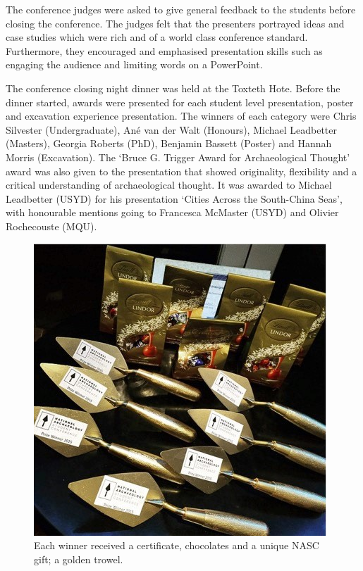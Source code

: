The conference judges were asked to give general feedback to the students before closing the conference. The judges felt that the presenters portrayed ideas and case studies which were rich and of a world class conference standard. Furthermore, they encouraged and emphasised presentation skills such as engaging the audience and limiting words on a PowerPoint. 

The conference closing night dinner was held at the Toxteth Hote. Before the dinner started, awards were presented for each student level presentation, poster and excavation experience presentation. The winners of each category were Chris Silvester (Undergraduate), Ané van der Walt (Honours), Michael Leadbetter (Masters), Georgia Roberts (PhD), Benjamin Bassett (Poster) and Hannah Morris (Excavation). The ‘Bruce G. Trigger Award for Archaeological Thought’ award was also given to the presentation that showed originality, flexibility and a critical understanding of archaeological thought. It was awarded to Michael Leadbetter (USYD) for his presentation ‘Cities Across the South-China Seas’, with honourable mentions going to Francesca McMaster (USYD) and Olivier Rochecouste (MQU).

\begin{figure}
	\includegraphics[width=.6\linewidth]{figures/NASC_Fig5}
	\centering
	\caption{Each winner received a certificate, chocolates and a unique NASC gift; a golden trowel.}
	\label{fig:NASC_Fig5}
\end{figure}

